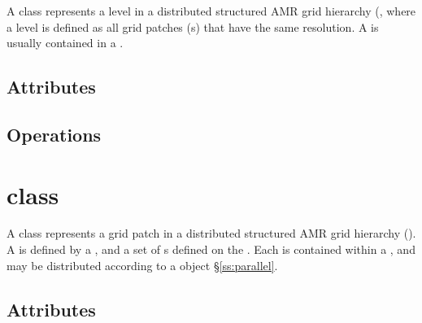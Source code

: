 A  class represents a level in a distributed structured
AMR grid hierarchy (, where a level is defined as all
grid patches (s) that have the same resolution.  A
 is usually contained in a .


\subsection{Attributes}

\subsection{Operations}

\section{ class}

A  class represents a grid patch in a distributed structured
AMR grid hierarchy ().  A  is defined by a
, and a set of s defined on the .  Each
 is contained within a , and may be distributed
according to a  object \S\ref{ss:parallel}.

\subsection{Attributes}

